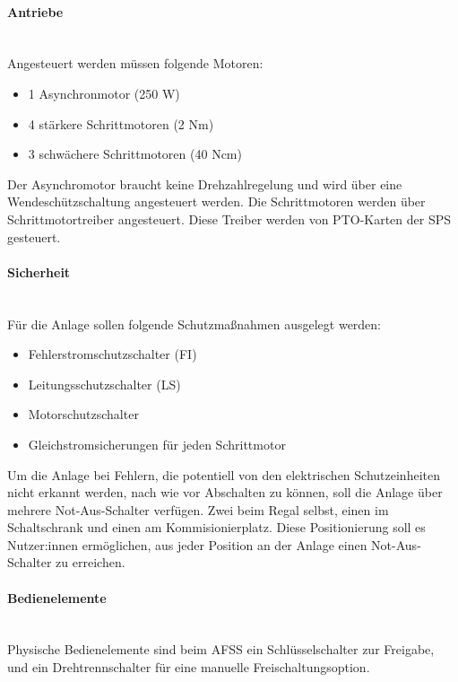     \paragraph{Antriebe}\mbox{}\\
    Angesteuert werden müssen folgende Motoren:
    \begin{itemize}
        \item 1 Asynchronmotor (250 W)
        \item 4 stärkere Schrittmotoren (2 Nm)
        \item 3 schwächere Schrittmotoren (40 Ncm)
    \end{itemize}
    Der Asynchromotor braucht keine Drehzahlregelung und wird über eine Wendeschützschaltung angesteuert werden. Die Schrittmotoren werden über Schrittmotortreiber angesteuert. Diese Treiber werden von PTO-Karten der SPS gesteuert.

    \paragraph{Sicherheit}\mbox{}\\
    Für die Anlage sollen folgende Schutzmaßnahmen ausgelegt werden:
    \begin{itemize}
        \item Fehlerstromschutzschalter (FI)
        \item Leitungsschutzschalter (LS)
        \item Motorschutzschalter
        \item Gleichstromsicherungen für jeden Schrittmotor
    \end{itemize} 
    Um die Anlage bei Fehlern, die potentiell von den elektrischen Schutzeinheiten nicht erkannt werden, nach wie vor Abschalten zu können, soll die Anlage über mehrere Not-Aus-Schalter verfügen. Zwei beim Regal selbst, einen im Schaltschrank und einen am Kommisionierplatz. Diese Positionierung soll es Nutzer:innen ermöglichen, aus jeder Position an der Anlage einen Not-Aus-Schalter zu erreichen.

    \paragraph{Bedienelemente}\mbox{}\\
    Physische Bedienelemente sind beim AFSS ein Schlüsselschalter zur Freigabe, und ein Drehtrennschalter für eine manuelle Freischaltungsoption.

